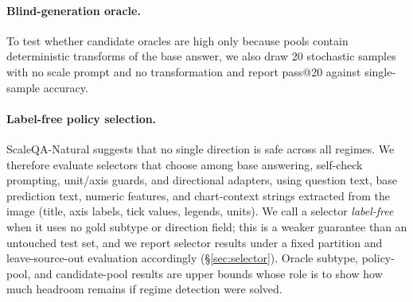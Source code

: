 \paragraph{Blind-generation oracle.}
To test whether candidate oracles are high only because pools contain deterministic transforms of the base answer, we also draw 20 stochastic samples with no scale prompt and no transformation and report pass@20 against single-sample accuracy.

\paragraph{Label-free policy selection.}
\label{sec:router_method}
ScaleQA-Natural suggests that no single direction is safe across all regimes. We therefore evaluate selectors that choose among base answering, self-check prompting, unit/axis guards, and directional adapters, using question text, base prediction text, numeric features, and chart-context strings extracted from the image (title, axis labels, tick values, legends, units). We call a selector \emph{label-free} when it uses no gold subtype or direction field; this is a weaker guarantee than an untouched test set, and we report selector results under a fixed partition and leave-source-out evaluation accordingly (\S\ref{sec:selector}). Oracle subtype, policy-pool, and candidate-pool results are upper bounds whose role is to show how much headroom remains if regime detection were solved.
